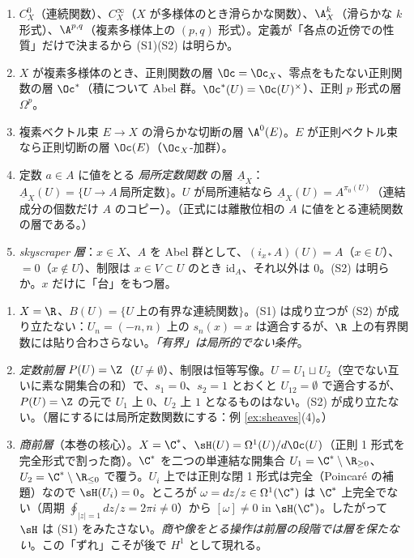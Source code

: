\begin{ex}[層になる例]\label{ex:sheaves}
\begin{enumerate}
\item $C^0_X$（連続関数）、$C^\infty_X$（$X$ が多様体のとき滑らかな関数）、$\A^k_X$（滑らかな $k$ 形式）、$\A^{p,q}$（複素多様体上の $(p,q)$ 形式）。定義が「各点の近傍での性質」だけで決まるから (S1)(S2) は明らか。
\item $X$ が複素多様体のとき、正則関数の層 $\Oc=\Oc_X$、零点をもたない正則関数の層 $\Oc^*$（積について Abel 群。$\Oc^*(U)=\Oc(U)^\times$）、正則 $p$ 形式の層 $\Omega^p$。
\item 複素ベクトル束 $E\to X$ の滑らかな切断の層 $\A^0(E)$。$E$ が正則ベクトル束なら正則切断の層 $\Oc(E)$（$\Oc_X$-加群）。
\item 定数 $a\in A$ に値をとる \emph{局所定数関数} の層 $\underline A_X$：$\underline A_X(U)=\{U\to A\ \text{局所定数}\}$。$U$ が局所連結なら $\underline A_X(U)=A^{\pi_0(U)}$（連結成分の個数だけ $A$ のコピー）。（正式には離散位相の $A$ に値をとる連続関数の層である。）
\item \emph{skyscraper 層}：$x\in X$、$A$ を Abel 群として、$(i_{x*}A)(U)=A$（$x\in U$）、$=0$（$x\notin U$）、制限は $x\in V\subset U$ のとき $\mathrm{id}_A$、それ以外は $0$。(S2) は明らか。$x$ だけに「台」をもつ層。
\end{enumerate}
\end{ex}
\begin{ex}[前層だが層でないもの]\label{ex:notsheaf}
\begin{enumerate}
\item $X=\R$、$B(U)=\{U\ \text{上の有界な連続関数}\}$。(S1) は成り立つが (S2) が成り立たない：$U_n=(-n,n)$ 上の $s_n(x)=x$ は適合するが、$\R$ 上の有界関数には貼り合わさらない。\emph{「有界」は局所的でない条件}。
\item \emph{定数前層} $P(U)=\Z$（$U\ne\emptyset$）、制限は恒等写像。$U=U_1\sqcup U_2$（空でない互いに素な開集合の和）で、$s_1=0$、$s_2=1$ とおくと $U_{12}=\emptyset$ で適合するが、$P(U)=\Z$ の元で $U_1$ 上 $0$、$U_2$ 上 $1$ となるものはない。(S2) が成り立たない。（層にするには局所定数関数にする：例 \ref{ex:sheaves}(4)。）
\item \emph{商前層}（本巻の核心）。$X=\C^*$、$\sH(U)=\Omega^1(U)/d\Oc(U)$（正則 1 形式を完全形式で割った商）。$\C^*$ を二つの単連結な開集合 $U_1=\C^*\setminus\R_{\ge0}$、$U_2=\C^*\setminus\R_{\le0}$ で覆う。$U_i$ 上では正則な閉 1 形式は完全（Poincar\'e の補題）なので $\sH(U_i)=0$。ところが $\omega=dz/z\in\Omega^1(\C^*)$ は $\C^*$ 上完全でない（周期 $\oint_{|z|=1}dz/z=2\pi i\ne0$）から $[\omega]\ne0$ in $\sH(\C^*)$。したがって $\sH$ は (S1) をみたさない。\emph{商や像をとる操作は前層の段階では層を保たない}。この「ずれ」こそが後で $H^1$ として現れる。
\end{enumerate}
\end{ex}

